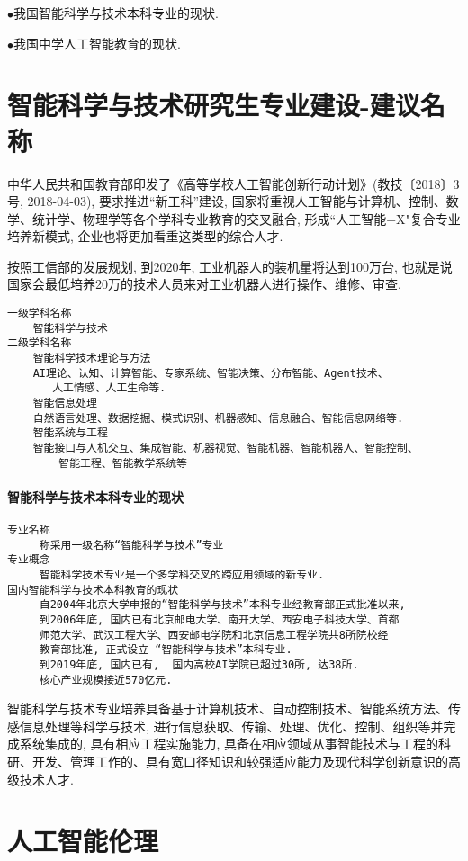 $\bullet$我国智能科学与技术本科专业的现状.

$\bullet$我国中学人工智能教育的现状.
\section{智能科学与技术研究生专业建设-建议名称}
中华人民共和国教育部印发了《高等学校人工智能创新行动计划》(教技〔2018〕3号,  2018-04-03), 要求推进“新工科”建设,
国家将重视人工智能与计算机、控制、数学、统计学、物理学等各个学科专业教育的交叉融合, 形成``人工智能+X"复合专业培养新模式, 企业也将更加看重这类型的综合人才.

按照工信部的发展规划, 到2020年, 工业机器人的装机量将达到100万台, 也就是说国家会最低培养20万的技术人员来对工业机器人进行操作、维修、审查.
\begin{Verbatim}
一级学科名称
    智能科学与技术
二级学科名称
    智能科学技术理论与方法
    AI理论、认知、计算智能、专家系统、智能决策、分布智能、Agent技术、
       人工情感、人工生命等.
    智能信息处理
    自然语言处理、数据挖掘、模式识别、机器感知、信息融合、智能信息网络等.
    智能系统与工程
    智能接口与人机交互、集成智能、机器视觉、智能机器、智能机器人、智能控制、
        智能工程、智能教学系统等
\end{Verbatim}
\paragraph{智能科学与技术本科专业的现状}
\begin{Verbatim}
专业名称
     称采用一级名称“智能科学与技术”专业
专业概念
     智能科学技术专业是一个多学科交叉的跨应用领域的新专业.
国内智能科学与技术本科教育的现状
     自2004年北京大学申报的“智能科学与技术”本科专业经教育部正式批准以来,
     到2006年底, 国内已有北京邮电大学、南开大学、西安电子科技大学、首都
     师范大学、武汉工程大学、西安邮电学院和北京信息工程学院共8所院校经
     教育部批准, 正式设立 “智能科学与技术”本科专业.
     到2019年底, 国内已有,  国内高校AI学院已超过30所, 达38所.
     核心产业规模接近570亿元.
\end{Verbatim}

智能科学与技术专业培养具备基于计算机技术、自动控制技术、智能系统方法、传感信息处理等科学与技术, 进行信息获取、传输、处理、优化、控制、组织等并完成系统集成的, 具有相应工程实施能力,
具备在相应领域从事智能技术与工程的科研、开发、管理工作的、具有宽口径知识和较强适应能力及现代科学创新意识的高级技术人才.
\section{人工智能伦理}

